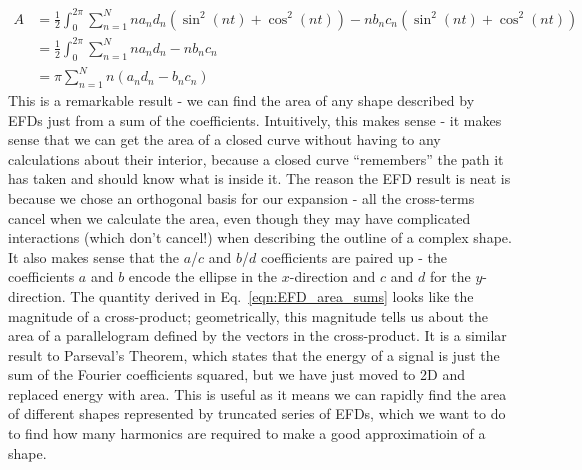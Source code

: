 \documentclass[11pt,a4paper]{article}
\begin{document}
\begin{equation}
	\label{eqn:EFD_area_sums}
	\begin{aligned}
		A & = \frac{1}{2}\int_0^{2\pi}\sum_{n=1}^Nna_nd_n(\sin^2(nt) + \cos^2(nt)) - nb_nc_n(\sin^2(nt) + \cos^2(nt)) \\
		  & = \frac{1}{2}\int_0^{2\pi}\sum_{n=1}^Nna_nd_n - nb_nc_n \\
          & = \pi\sum_{n=1}^Nn(a_nd_n - b_nc_n)
	\end{aligned}
\end{equation}
This is a remarkable result - we can find the area of any shape described by EFDs just from a sum of the coefficients.
\bigbreak
Intuitively, this makes sense - it makes sense that we can get the area of a closed curve without having to any calculations about their interior,
because a closed curve ``remembers'' the path it has taken and should know what is inside it.
The reason the EFD result is neat is because we chose an orthogonal basis for our expansion - all the cross-terms
cancel when we calculate the area, even though they may have complicated interactions (which don't cancel!) when describing the outline of a complex shape.
It also makes sense that the $a$/$c$ and $b$/$d$ coefficients are paired up - the coefficients
$a$ and $b$ encode the ellipse in the $x$-direction and $c$ and $d$ for the $y$-direction. The quantity derived in
Eq.~\ref{eqn:EFD_area_sums} looks like the magnitude of a cross-product; geometrically, this magnitude tells us about
the area of a parallelogram defined by the vectors in the cross-product. It is a similar result to Parseval's Theorem, which
states that the energy of a signal is just the sum of the Fourier coefficients squared, but we have just moved to 2D and replaced
energy with area.
\bigbreak
This is useful as it means we can rapidly find the area of different shapes represented by truncated series of EFDs,
which we want to do to find how many harmonics are required to make a good approximatioin of a shape.
\end{document}
